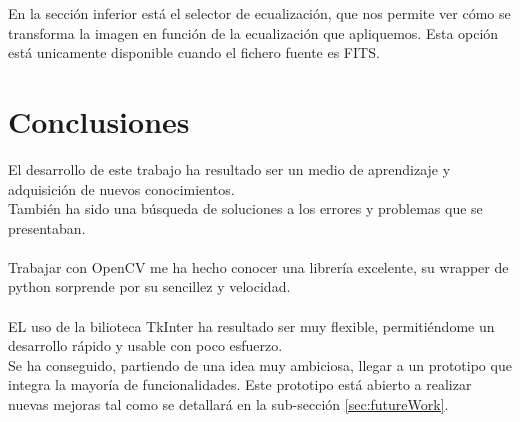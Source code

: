 \begin{itemize}
\begin{figure}[!htb]
				\caption{\label{fig:BarraDerecha}}
			\end{figure}
		En la sección inferior está el selector de ecualización, que nos permite ver cómo se transforma la imagen en función de la ecualización que apliquemos. Esta opción está unicamente disponible cuando el fichero fuente es FITS.
		
	\end{itemize}

	\newpage
	\section{Conclusiones}
	El desarrollo de este trabajo ha resultado ser un medio de aprendizaje y
	adquisición de nuevos conocimientos.\\
	También ha sido una búsqueda de soluciones a los errores y problemas que se presentaban.\\ \\
	Trabajar con OpenCV me ha hecho conocer una librería excelente, su wrapper de python sorprende por su sencillez y velocidad.\\ \\
	EL uso de la bilioteca TkInter ha resultado ser muy flexible, permitiéndome un desarrollo rápido y usable con poco esfuerzo.\\
	Se ha conseguido, partiendo de una idea muy ambiciosa, llegar a un prototipo que integra la mayoría de funcionalidades. Este prototipo está abierto a realizar nuevas mejoras tal como se detallará en la sub-sección \ref{sec:futureWork}.
	\\
	\newline

